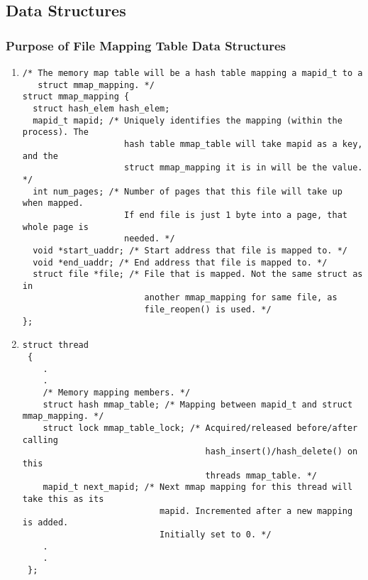\documentclass{article}
\renewcommand{\_}{\char`_}
\begin{document}
\subsection{Data Structures}

\subsubsection{Purpose of File Mapping Table Data Structures}
\begin{enumerate}

\item

\begin{lstlisting}
/* The memory map table will be a hash table mapping a mapid_t to a
   struct mmap_mapping. */
struct mmap_mapping {
  struct hash_elem hash_elem;
  mapid_t mapid; /* Uniquely identifies the mapping (within the process). The
                    hash table mmap_table will take mapid as a key, and the
                    struct mmap_mapping it is in will be the value. */
  int num_pages; /* Number of pages that this file will take up when mapped.
                    If end file is just 1 byte into a page, that whole page is
                    needed. */
  void *start_uaddr; /* Start address that file is mapped to. */
  void *end_uaddr; /* End address that file is mapped to. */
  struct file *file; /* File that is mapped. Not the same struct as in
                        another mmap_mapping for same file, as
                        file_reopen() is used. */
};
\end{lstlisting}

\item

\begin{lstlisting}
struct thread 
 {
    .
    .
    /* Memory mapping members. */
    struct hash mmap_table; /* Mapping between mapid_t and struct mmap_mapping. */
    struct lock mmap_table_lock; /* Acquired/released before/after calling
                                    hash_insert()/hash_delete() on this
                                    threads mmap_table. */
    mapid_t next_mapid; /* Next mmap mapping for this thread will take this as its
                           mapid. Incremented after a new mapping is added.
                           Initially set to 0. */
    .
    .
 };
\end{lstlisting}

\end{enumerate}
\end{document}
